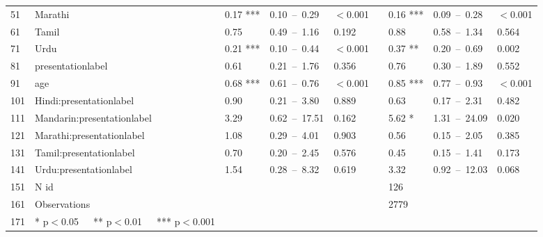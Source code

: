 \begin{table}[ht]
\begin{tabular}{}
  51 & Marathi & 0.17 *** & 0.10 – 0.29 & $<$0.001 &  & 0.16 *** & 0.09 – 0.28 & $<$0.001 \\ 
  61 & Tamil & 0.75 & 0.49 – 1.16 & 0.192 &  & 0.88 & 0.58 – 1.34 & 0.564 \\ 
  71 & Urdu & 0.21 *** & 0.10 – 0.44 & $<$0.001 &  & 0.37 ** & 0.20 – 0.69 & 0.002 \\ 
  81 & presentationlabel & 0.61 & 0.21 – 1.76 & 0.356 &  & 0.76 & 0.30 – 1.89 & 0.552 \\ 
  91 & age & 0.68 *** & 0.61 – 0.76 & $<$0.001 &  & 0.85 *** & 0.77 – 0.93 & $<$0.001 \\ 
  101 & Hindi:presentationlabel & 0.90 & 0.21 – 3.80 & 0.889 &  & 0.63 & 0.17 – 2.31 & 0.482 \\ 
  111 & Mandarin:presentationlabel & 3.29 & 0.62 – 17.51 & 0.162 &  & 5.62 * & 1.31 – 24.09 & 0.020 \\ 
  121 & Marathi:presentationlabel & 1.08 & 0.29 – 4.01 & 0.903 &  & 0.56 & 0.15 – 2.05 & 0.385 \\ 
  131 & Tamil:presentationlabel & 0.70 & 0.20 – 2.45 & 0.576 &  & 0.45 & 0.15 – 1.41 & 0.173 \\ 
  141 & Urdu:presentationlabel & 1.54 & 0.28 – 8.32 & 0.619 &  & 3.32 & 0.92 – 12.03 & 0.068 \\ 
  151 & N id &  &  &  &  & 126 &  &  \\ 
  161 & Observations &  &  &  &  & 2779 &  &  \\ 
  171 & * p$<$0.05   ** p$<$0.01   *** p$<$0.001 &  &  &  &  &  &  &  \\ 
   \hline
\end{tabular}
\end{table}
